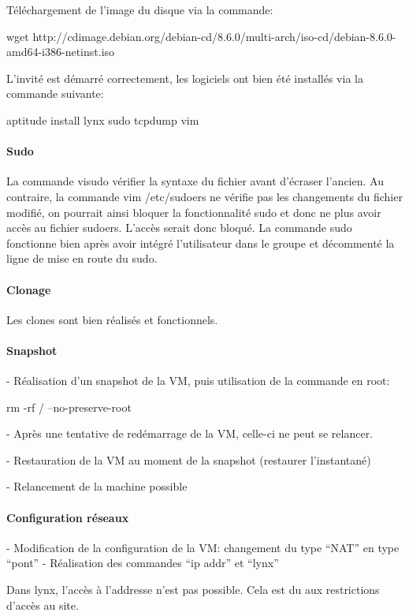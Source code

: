 \documentclass[a4paper,12pt]{article}
\begin{document}
Téléchargement de l'image du disque via la commande:

wget http://cdimage.debian.org/debian-cd/8.6.0/multi-arch/iso-cd/debian-8.6.0-amd64-i386-netinst.iso

L'invité est démarré correctement, les logiciels ont bien été installés via la commande suivante:

aptitude install lynx sudo tcpdump vim

\paragraph{Sudo}

La commande visudo vérifier la syntaxe du fichier avant d'écraser l'ancien. Au contraire, la commande vim /etc/sudoers ne vérifie pas les changements du fichier modifié, on pourrait ainsi bloquer la fonctionnalité sudo et donc ne plus avoir accès au fichier sudoers. L'accès serait donc bloqué.
La commande sudo fonctionne bien après avoir intégré l'utilisateur dans le groupe et décommenté la ligne de mise en route du sudo.

\paragraph{Clonage}

Les clones sont bien réalisés et fonctionnels.

\paragraph{Snapshot}

- Réalisation d'un snapshot de la VM, puis utilisation de la commande en root:

rm -rf / --no-preserve-root

- Après une tentative de redémarrage de la VM, celle-ci ne peut se relancer.

- Restauration de la VM au moment de la snapshot (restaurer l'instantané)

- Relancement de la machine possible

\paragraph{Configuration réseaux}

- Modification de la configuration de la VM: changement du type ``NAT'' en type ``pont'' 
- Réalisation des commandes ``ip addr'' et ``lynx''

Dans lynx, l'accès à l'addresse n'est pas possible. Cela est du aux restrictions d'accès au site.



\clearpage
\end{document}

